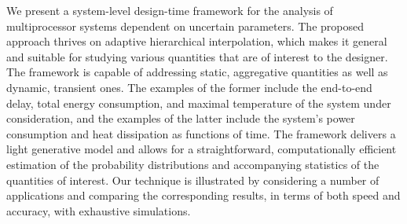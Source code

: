 We present a system-level design-time framework for the analysis of
multiprocessor systems dependent on uncertain parameters. The proposed approach
thrives on adaptive hierarchical interpolation, which makes it general and
suitable for studying various quantities that are of interest to the designer.
The framework is capable of addressing static, aggregative quantities as well as
dynamic, transient ones. The examples of the former include the end-to-end
delay, total energy consumption, and maximal temperature of the system under
consideration, and the examples of the latter include the system's power
consumption and heat dissipation as functions of time. The framework delivers a
light generative model and allows for a straightforward, computationally
efficient estimation of the probability distributions and accompanying
statistics of the quantities of interest. Our technique is illustrated by
considering a number of applications and comparing the corresponding results, in
terms of both speed and accuracy, with exhaustive simulations.

